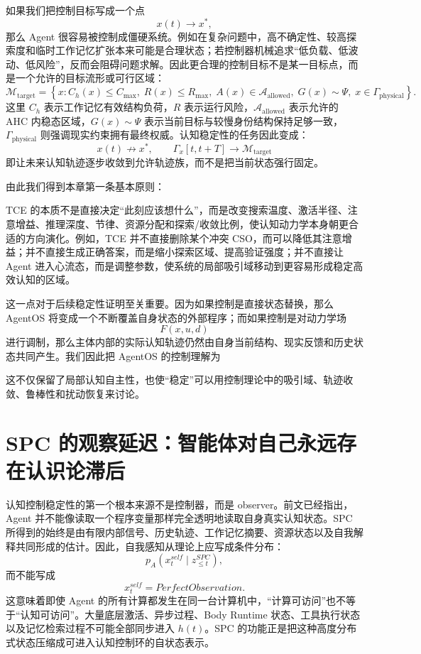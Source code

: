 如果我们把控制目标写成一个点
\[
x(t)\rightarrow x^{*},
\]
那么 Agent 很容易被控制成僵硬系统。例如在复杂问题中，高不确定性、较高探索度和临时工作记忆扩张本来可能是合理状态；若控制器机械追求“低负载、低波动、低风险”，反而会阻碍问题求解。因此更合理的控制目标不是某一目标点，而是一个允许的目标流形或可行区域：
\[
\mathcal{M}_{\mathrm{target}}
=
\left\{
x:
C_h(x)\le C_{\max},
\;
R(x)\le R_{\max},
\;
A(x)\in\mathcal{A}_{\mathrm{allowed}},
\;
G(x)\sim\Psi,
\;
x\in\Gamma_{\mathrm{physical}}
\right\}.
\]
这里 $C_h$ 表示工作记忆有效结构负荷，$R$ 表示运行风险，$\mathcal{A}_{\mathrm{allowed}}$ 表示允许的 AHC 内稳态区域，$G(x)\sim\Psi$ 表示当前目标与较慢身份结构保持足够一致，$\Gamma_{\mathrm{physical}}$ 则强调现实约束拥有最终权威。认知稳定性的任务因此变成：
\[
\boxed{
x(t)\not\rightarrow x^{*},
\qquad
\Gamma_{x}[t,t+T]
\rightarrow
\mathcal{M}_{\mathrm{target}}
}
\]
即让未来认知轨迹逐步收敛到允许轨迹族，而不是把当前状态强行固定。

由此我们得到本章第一条基本原则：
\begin{statementbox}
\centering
{}
\end{statementbox}
TCE 的本质不是直接决定“此刻应该想什么”，而是改变搜索温度、激活半径、注意增益、推理深度、节律、资源分配和探索/收敛比例，使认知动力学本身朝更合适的方向演化。例如，TCE 并不直接删除某个冲突 CSO，而可以降低其注意增益；并不直接生成正确答案，而是缩小探索区域、提高验证强度；并不直接让 Agent 进入心流态，而是调整参数，使系统的局部吸引域移动到更容易形成稳定高效认知的区域。

这一点对于后续稳定性证明至关重要。因为如果控制是直接状态替换，那么 AgentOS 将变成一个不断覆盖自身状态的外部程序；而如果控制是对动力学场
\[
F(x,u,d)
\]
进行调制，那么主体内部的实际认知轨迹仍然由自身当前结构、现实反馈和历史状态共同产生。我们因此把 AgentOS 的控制理解为
\begin{statementbox}
\centering
{}
\end{statementbox}
这不仅保留了局部认知自主性，也使“稳定”可以用控制理论中的吸引域、轨迹收敛、鲁棒性和扰动恢复来讨论。

\section{SPC 的观察延迟：智能体对自己永远存在认识论滞后}

认知控制稳定性的第一个根本来源不是控制器，而是 observer。前文已经指出，Agent 并不能像读取一个程序变量那样完全透明地读取自身真实认知状态。SPC 所得到的始终是由有限内部信号、历史轨迹、工作记忆摘要、资源状态以及自我解释共同形成的估计。因此，自我感知从理论上应写成条件分布：
\[
p_A
\left(
x_t^{self}
\mid
z_{\le t}^{SPC}
\right),
\]
而不能写成
\[
x_t^{self}
=
PerfectObservation.
\]
这意味着即使 Agent 的所有计算都发生在同一台计算机中，``计算可访问''也不等于``认知可访问''。大量底层激活、异步过程、Body Runtime 状态、工具执行状态以及记忆检索过程不可能全部同步进入 $h(t)$。SPC 的功能正是把这种高度分布式状态压缩成可进入认知控制环的自状态表示。

